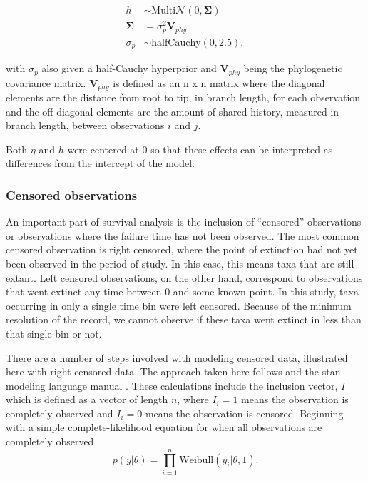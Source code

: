 \documentclass[12pt,letterpaper]{article}
\begin{document}
\begin{align*}
  h &\sim \mathrm{Multi}\mathcal{N}(0, \mathbf{\Sigma}) \\
  \mathbf{\Sigma} &= \sigma_{p}^{2} \mathbf{V}_{phy} \\
  \sigma_{p} &\sim \mathrm{halfCauchy}(0, 2.5),
\end{align*}
 
with \(\sigma_{p}\) also given a half-Cauchy hyperprior and \(\mathbf{V}_{phy}\) being the phylogenetic covariance matrix. \(\mathbf{V}_{phy}\) is defined as an n x n matrix where the diagonal elements are the distance from root to tip, in branch length, for each observation and the off-diagonal elements are the amount of shared history, measured in branch length, between observations \(i\) and \(j\).

Both \(\eta\) and \(h\) were centered at 0 so that these effects can be interpreted as differences from the intercept of the model. 


\subsubsection{Censored observations} \label{sec:censor}

An important part of survival analysis is the inclusion of ``censored'' observations \citep{Ibrahim2001,Klein2003} or observations where the failure time has not been observed. The most common censored observation is right censored, where the point of extinction had not yet been observed in the period of study. In this case, this means taxa that are still extant. Left censored observations, on the other hand, correspond to observations that went extinct any time between 0 and some known point. In this study, taxa occurring in only a single time bin were left censored. Because of the minimum resolution of the record, we cannot observe if these taxa went extinct in less than that single bin or not. 

There are a number of steps involved with modeling censored data, illustrated here with right censored data. The approach taken here follows \citet{Gelman2013d} and the stan modeling language manual \citep{stan-manual:2014}. These calculations include the inclusion vector, \(I\) which is defined as a vector of length \(n\), where \(I_{i} = 1\) means the observation is completely observed and \(I_{i} = 0\) means the observation is censored. Beginning with a simple complete-likelihood equation for when all observations are completely observed
\begin{equation*}
  p(y | \theta) = \prod_{i = 1}^{n} \mathrm{Weibull}(y_{i}|\theta, 1).
\end{equation*}
\end{document}
